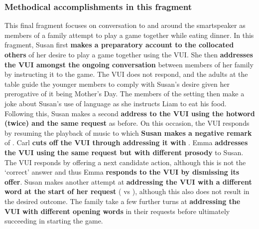 \subsubsection{Methodical accomplishments in this fragment}\label{sec:empirical home findings game methods}
\begin{revisedsubmission}
This final fragment focuses on conversation to and around the smartspeaker as members of a family attempt to play a game together while eating dinner.
In this fragment, Susan first \textbf{makes a preparatory account to the collocated others} of her desire to play a game together using the \ac{VUI}.
She then \textbf{addresses the \ac{VUI} amongst the ongoing conversation} between members of her family by instructing it to  the game.
The \ac{VUI} does not respond, and the adults at the table guide the younger members to comply with Susan's desire given her prerogative of it being Mother's Day.
The members of the setting then make a joke about Susan's use of language as she instructs Liam to eat his food.
Following this, Susan makes a second \textbf{address to the \ac{VUI} using the hotword (twice) and the same request} as before.
On this occasion, the \ac{VUI} responds by resuming the playback of music to which \textbf{Susan makes a negative remark} of .
Carl \textbf{cuts off the \ac{VUI} through addressing it with }.
Emma \textbf{addresses the \ac{VUI} using the same request but with different prosody} to Susan.
The \ac{VUI} responds by offering a next candidate action, although this is not the `correct' answer and thus Emma \textbf{responds to the \ac{VUI} by dismissing its offer}.
Susan makes another attempt at \textbf{addressing the \ac{VUI} with a different word at the start of her request} ( vs ), although this also does not result in the desired outcome.
The family take a few further turns at \textbf{addressing the \ac{VUI} with different opening words} in their requests before ultimately succeeding in starting the game.
\end{revisedsubmission}






